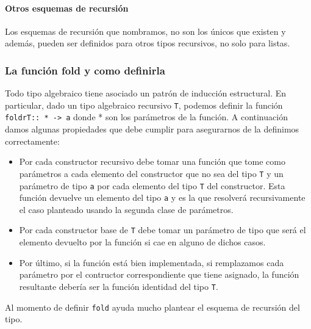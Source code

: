 \paragraph{Otros esquemas de recursión} Los esquemas de recursión que nombramos, no son los únicos que existen y además, pueden ser definidos para otros tipos recursivos, no solo para listas.

\subsubsection{La función fold y como definirla}
Todo tipo algebraico tiene asociado un patrón de inducción estructural. En particular, dado un tipo algebraico recursivo \texttt{T}, podemos definir la función \texttt{foldrT:: * -> a} donde * son los parámetros de la función. A continuación damos algunas propiedades que debe cumplir para asegurarnos de la definimos correctamente:
\begin{itemize}
	\item Por cada constructor recursivo debe tomar una función que tome como parámetros a cada elemento del constructor que no sea del tipo \texttt{T} y un parámetro de tipo \texttt{a} por cada elemento del tipo \texttt{T}  del constructor. Esta función devuelve un elemento del tipo \texttt{a} y es la que resolverá recursivamente el caso planteado usando la segunda clase de parámetros.
	\item Por cada constructor base de \texttt{T} debe tomar un parámetro de tipo  que será el elemento devuelto por la función si cae en alguno de dichos casos.
	\item Por último, si la función está bien implementada, si remplazamos cada parámetro por el contructor correspondiente que tiene asignado, la función resultante debería ser la función identidad del tipo \texttt{T}.
\end{itemize}


Al momento de definir \texttt{fold} ayuda mucho plantear el esquema de recursión del tipo.